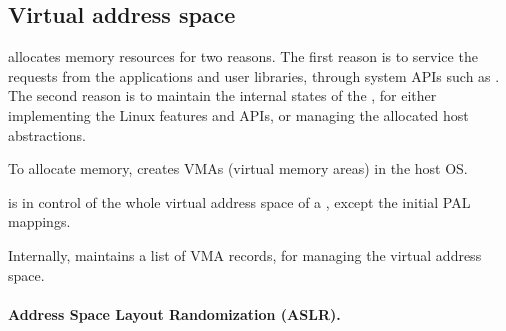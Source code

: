 \subsection{Virtual address space}
\label{sec:libos:vma}

\thelibos{} allocates memory resources
for two reasons.
The first reason is to service the requests from the applications and user libraries,
through 
system APIs such as .
The second reason
is to maintain the internal states
of the \libos{},
for either implementing the Linux features and APIs, or managing the allocated host abstractions.



To allocate memory, \thelibos{} creates VMAs (virtual memory areas)
in the host OS.



\thelibos{} is in control of the whole virtual address space of a \picoproc{},
except the initial PAL mappings.








Internally, \thelibos{} maintains a list of VMA records, for managing the virtual address space.









\paragraph{Address Space Layout Randomization (ASLR).}

